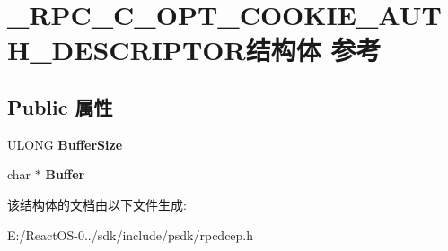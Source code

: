 \hypertarget{struct___r_p_c___c___o_p_t___c_o_o_k_i_e___a_u_t_h___d_e_s_c_r_i_p_t_o_r}{}\section{\+\_\+\+R\+P\+C\+\_\+\+C\+\_\+\+O\+P\+T\+\_\+\+C\+O\+O\+K\+I\+E\+\_\+\+A\+U\+T\+H\+\_\+\+D\+E\+S\+C\+R\+I\+P\+T\+O\+R结构体 参考}
\label{struct___r_p_c___c___o_p_t___c_o_o_k_i_e___a_u_t_h___d_e_s_c_r_i_p_t_o_r}
\subsection*{Public 属性}
\begin{DoxyCompactItemize}
\item 
\mbox{\label{struct___r_p_c___c___o_p_t___c_o_o_k_i_e___a_u_t_h___d_e_s_c_r_i_p_t_o_r_a00ce8c1b5887ca38e59e3036c619d749}} 
U\+L\+O\+NG {\bfseries Buffer\+Size}
\item 
\mbox{\label{struct___r_p_c___c___o_p_t___c_o_o_k_i_e___a_u_t_h___d_e_s_c_r_i_p_t_o_r_a17ed5074032ac4c5b9ebaaf147e01205}} 
char $\ast$ {\bfseries Buffer}
\end{DoxyCompactItemize}


该结构体的文档由以下文件生成\+:\begin{DoxyCompactItemize}
\item 
E\+:/\+React\+O\+S-\/0../sdk/include/psdk/rpcdcep.\+h\end{DoxyCompactItemize}
